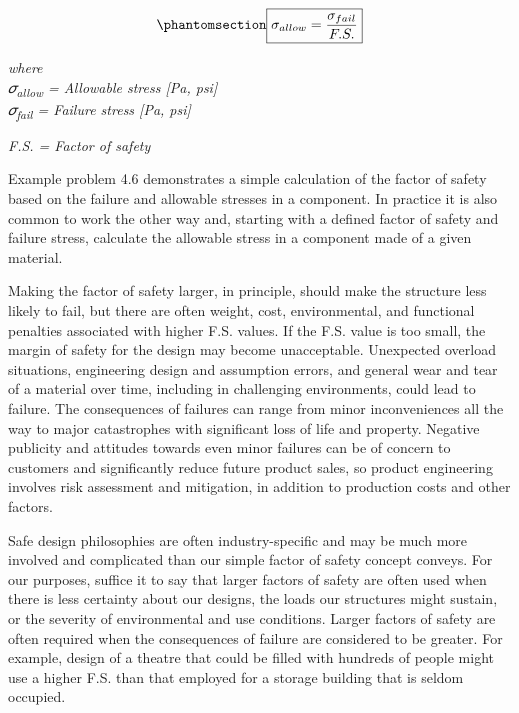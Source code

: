 \documentclass[
  letterpaper,
  DIV=11,
  numbers=noendperiod]{scrreprt}
\theoremstyle{definition}
\theoremstyle{remark}
\begin{document}
\begin{equation}\phantomsection\label{eq-4.9}{
\boxed{\sigma_{allow}=\frac{\sigma_{fail}}{F . S .}}
}\end{equation}

\emph{where}\\
\emph{𝜎\textsubscript{allow} = Allowable stress {[}Pa, psi{]}}\\
\emph{𝜎\textsubscript{fail} = Failure stress {[}Pa, psi{]}}

\emph{F.S. = Factor of safety}

Example problem 4.6 demonstrates a simple calculation of the factor of
safety based on the failure and allowable stresses in a component. In
practice it is also common to work the other way and, starting with a
defined factor of safety and failure stress, calculate the allowable
stress in a component made of a given material.

Making the factor of safety larger, in principle, should make the
structure less likely to fail, but there are often weight, cost,
environmental, and functional penalties associated with higher F.S.
values. If the F.S. value is too small, the margin of safety for the
design may become unacceptable. Unexpected overload situations,
engineering design and assumption errors, and general wear and tear of a
material over time, including in challenging environments, could lead to
failure. The consequences of failures can range from minor
inconveniences all the way to major catastrophes with significant loss
of life and property. Negative publicity and attitudes towards even
minor failures can be of concern to customers and significantly reduce
future product sales, so product engineering involves risk assessment
and mitigation, in addition to production costs and other factors.

Safe design philosophies are often industry-specific and may be much
more involved and complicated than our simple factor of safety concept
conveys. For our purposes, suffice it to say that larger factors of
safety are often used when there is less certainty about our designs,
the loads our structures might sustain, or the severity of environmental
and use conditions. Larger factors of safety are often required when the
consequences of failure are considered to be greater. For example,
design of a theatre that could be filled with hundreds of people might
use a higher F.S. than that employed for a storage building that is
seldom occupied.
\end{document}
